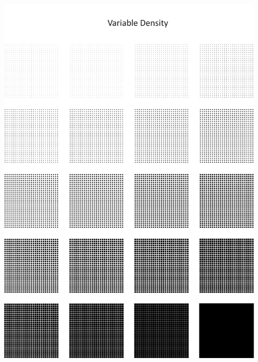 \documentclass[
  12pt,
  a4paper, twoside]{book}
\begin{document}
\begin{center}\includegraphics[width=1\linewidth]{Appendix/density} \end{center}

\newpage
\end{document}
